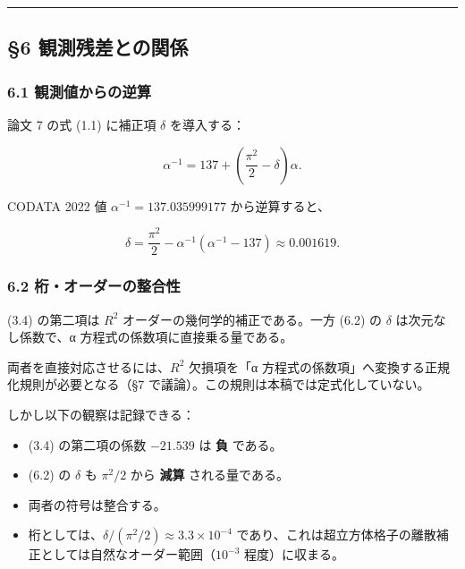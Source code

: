 \documentclass[
]{article}
\providecommand{\tightlist}{%
  \setlength{\itemsep}{0pt}\setlength{\parskip}{0pt}}
\begin{document}
\begin{center}\rule{0.5\linewidth}{0.5pt}\end{center}

\subsection{§6
観測残差との関係}\label{ux89b3ux6e2cux6b8bux5deeux3068ux306eux95a2ux4fc2}

\subsubsection{6.1
観測値からの逆算}\label{ux89b3ux6e2cux5024ux304bux3089ux306eux9006ux7b97}

論文 7 の式 (1.1) に補正項 \(\delta\) を導入する：

\[\alpha^{-1} = 137 + \left(\frac{\pi^2}{2} - \delta\right)\alpha. \tag{6.1}\]

CODATA 2022 値 \(\alpha^{-1} = 137.035999177\) から逆算すると、

\[\delta = \frac{\pi^2}{2} - \alpha^{-1}(\alpha^{-1} - 137) \approx 0.001619. \tag{6.2}\]

\subsubsection{6.2
桁・オーダーの整合性}\label{ux6841ux30aaux30fcux30c0ux30fcux306eux6574ux5408ux6027}

(3.4) の第二項は \(R^2\) オーダーの幾何学的補正である。一方 (6.2) の
\(\delta\) は次元なし係数で、α 方程式の係数項に直接乗る量である。

両者を直接対応させるには、\(R^2\) 欠損項を「α
方程式の係数項」へ変換する正規化規則が必要となる（§7
で議論）。この規則は本稿では定式化していない。

しかし以下の観察は記録できる：

\begin{itemize}
\tightlist
\item
  (3.4) の第二項の係数 \(-21.539\) は \textbf{負} である。
\item
  (6.2) の \(\delta\) も \(\pi^2/2\) から \textbf{減算} される量である。
\item
  両者の符号は整合する。
\item
  桁としては、\(\delta/(\pi^2/2) \approx 3.3 \times 10^{-4}\)
  であり、これは超立方体格子の離散補正としては自然なオーダー範囲（\(10^{-3}\)
  程度）に収まる。
\end{itemize}
\end{document}
